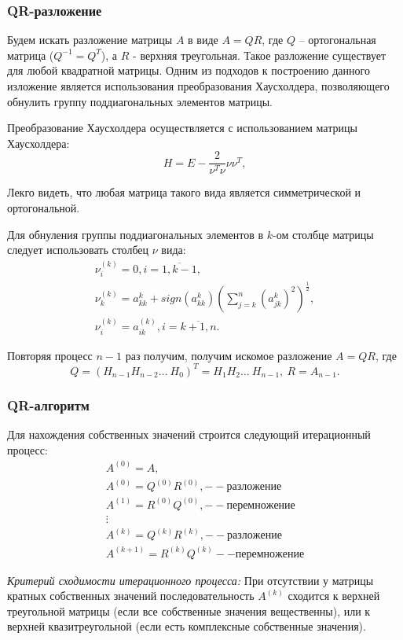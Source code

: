 \documentclass[a4paper,12pt]{article}
\begin{document}
\subsubsection{QR-разложение}
Будем искать разложение матрицы $A$ в виде
$A = QR$, где $Q$ -- ортогональная матрица ($Q^{-1} = Q^{T}$), а
$R$ - верхняя треугольная. Такое разложение существует для любой
квадратной матрицы. Одним из подходов к построению данного
изложение является использования преобразования Хаусхолдера,
позволяющего обнулить группу поддиагональных элементов матрицы.

Преобразование Хаусхолдера осуществляется с использованием
матрицы Хаусхолдера:
$$
H = E - \frac{2}{\nu^{T}\nu} \nu\nu^{T},
$$

Лекго видеть, что любая матрица такого вида является симметрической
и ортогональной.

Для обнуления группы поддиагональных элементов в $k$-ом столбце матрицы следует
использовать столбец $\nu$ вида:
$$
\begin{array}{l}
    \nu^{(k)}_i = 0, i = \overline{1, k - 1}, \\
    \nu^{(k)}_k = a_{kk}^{k} + sign(a_{kk}^{k})
        (\sum_{j = k}^{n}(a^{k}_{jk})^2)^{\frac{1}{2}}, \\
    \nu^{(k)}_i = a_{ik}^{(k)}, i = \overline{k + 1, n}.
\end{array}
$$

Повторяя процесс $n - 1$ раз получим, получим искомое разложение
$A = QR$, где 
$$
Q = (H_{n - 1}H_{n -2} \ldots\ H_{0})^T =
H_1 H_2 \ldots\ H_{n - 1},\ R = A_{n - 1}.
$$

\subsubsection{QR-алгоритм}
Для нахождения собственных значений строится следующий итерационный
процесс:
$$
\begin{array}{l}
    A^{(0)} = A, \\
    A^{(0)} = Q^{(0)} R^{(0)}, -- разложение \\
    A^{(1)} = R^{(0)} Q^{(0)}, -- перемножение \\
    \vdots \\
    A^{(k)} = Q^{(k)} R^{(k)}, -- разложение \\
    A^{(k + 1)} = R^{(k)} Q^{(k)} -- перемножение
\end{array}
$$

\textit{Критерий сходимости итерационного процесса:}
При отсутствии у матрицы кратных собственных
значений последовательность $A^{(k)}$ сходится к
верхней треугольной матрицы (если все собственные значения вещественны),
или к верхней квазитреугольной (если есть комплексные собственные
значения).
\end{document}
